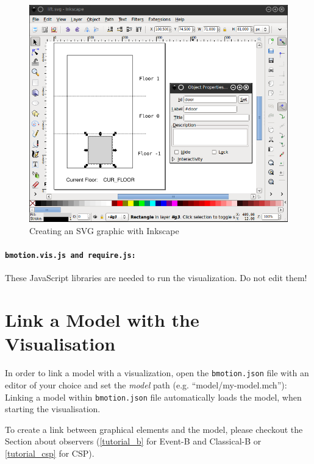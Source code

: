 \begin{figure}[!ht]
\begin{center}
	\includegraphics[width=12cm]{img/tutorial/tut_02.png}
	\caption{Creating an SVG graphic with Inkscape}
	\label{fig_tut_02_inkscape}
\end{center}
\end{figure} 

\paragraph{\texttt{bmotion.vis.js and require.js:}}
These JavaScript libraries are needed to run the visualization.
Do not edit them!

\section{Link a Model with the Visualisation}

In order to link a model with a visualization, open the \texttt{bmotion.json} file with an editor of your choice and set the \textit{model} path (e.g. ``model/my-model.mch''):
Linking a model within \texttt{bmotion.json} file automatically loads the model, when starting the visualisation.

To create a link between graphical elements and the model, please checkout the Section about observers (\ref{tutorial_b} for Event-B and Classical-B or \ref{tutorial_csp} for CSP).
